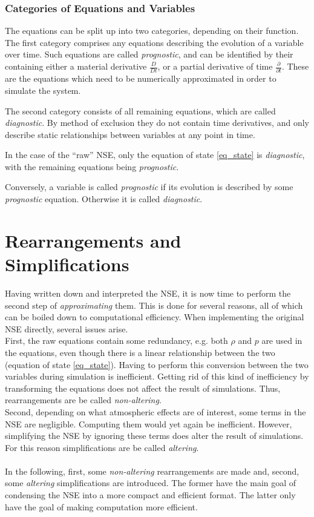 \subsubsection{Categories of Equations and Variables}
The equations can be split up into two categories, depending on their function.
The first category comprises any equations describing the evolution of a variable over time.
Such equations are called \emph{prognostic}, and can be identified by their containing either a material derivative $\frac{D}{Dt}$, or a partial derivative of time $\frac{\partial}{\partial t}$.
These are the equations which need to be numerically approximated in order to simulate the system.

The second category consists of all remaining equations, which are called \emph{diagnostic}.
By method of exclusion they do not contain time derivatives, and only describe static relationships between variables at any point in time.

In the case of the ``raw'' NSE, only the equation of state \ref{eq_state} is \emph{diagnostic}, with the remaining equations being \emph{prognostic}.

Conversely, a variable is called \emph{prognostic} if its evolution is described by some \emph{prognostic} equation.
Otherwise it is called \emph{diagnostic}.

\section{Rearrangements and Simplifications}
Having written down and interpreted the NSE, it is now time to perform the second step of \emph{approximating} them.
This is done for several reasons, all of which can be boiled down to computational efficiency.
When implementing the original NSE directly, several issues arise.
\\
First, the raw equations contain some redundancy, e.g. both $\rho$ and $p$ are used in the equations, even though there is a linear relationship between the two (equation of state \ref{eq_state}).
Having to perform this conversion between the two variables during simulation is inefficient.
Getting rid of this kind of inefficiency by transforming the equations does not affect the result of simulations.
Thus, rearrangements are be called \emph{non-altering}.
\\
Second, depending on what atmospheric effects are of interest, some terms in the NSE are negligible.
Computing them would yet again be inefficient.
However, simplifying the NSE by ignoring these terms does alter the result of simulations.
For this reason simplifications are be called \emph{altering}.
\\
\\
In the following, first, some \emph{non-altering} rearrangements are made and, second, some \emph{altering} simplifications are introduced.
The former have the main goal of condensing the NSE into a more compact and efficient format.
The latter only have the goal of making computation more efficient.

